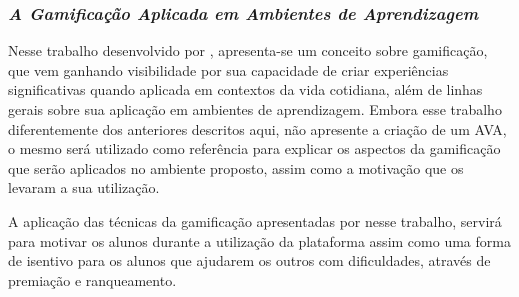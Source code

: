 \subsubsection{\textit{A Gamificação Aplicada em Ambientes de Aprendizagem}}

Nesse trabalho desenvolvido por , apresenta-se um conceito sobre gamificação, que vem ganhando visibilidade por sua capacidade de criar experiências significativas 
quando aplicada em  contextos  da  vida  cotidiana, além de linhas gerais sobre sua aplicação em ambientes de aprendizagem. Embora esse trabalho diferentemente dos anteriores descritos aqui, não 
apresente a criação de um AVA, o mesmo será utilizado como referência para explicar os aspectos da gamificação que serão aplicados no ambiente proposto, assim como a motivação que os levaram a sua 
utilização.

A aplicação das técnicas da gamificação apresentadas por  nesse trabalho, servirá para motivar os alunos durante a utilização da plataforma assim como uma forma de isentivo para os alunos que ajudarem os outros com dificuldades, através de premiação e ranqueamento.













